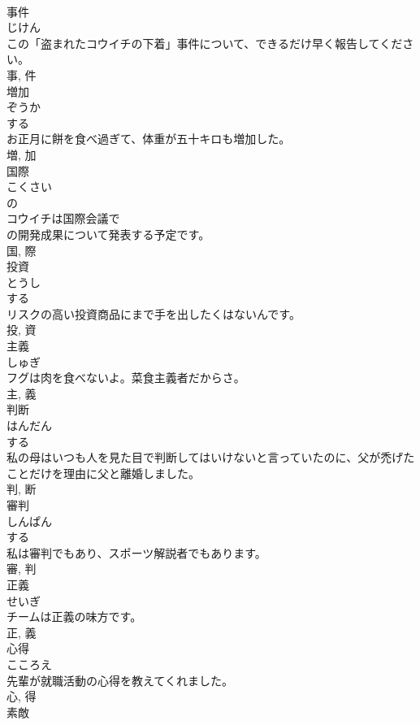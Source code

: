 \documentclass[8pt]{extreport}
\begin{document}
\begin{CJK}{UTF8}{min}
\\	事件	
\\	じけん	
\\	この「盗まれたコウイチの下着」事件について、できるだけ早く報告してください。	
\\	事, 件	
\\	増加	
\\	ぞうか	
\\	する 
\\	お正月に餅を食べ過ぎて、体重が五十キロも増加した。	
\\	増, 加	
\\	国際	
\\	こくさい	
\\	の 
\\	コウイチは国際会議で
\\	の開発成果について発表する予定です。	
\\	国, 際	
\\	投資	
\\	とうし	
\\	する 
\\	リスクの高い投資商品にまで手を出したくはないんです。	
\\	投, 資	
\\	主義	
\\	しゅぎ	
\\	フグは肉を食べないよ。菜食主義者だからさ。	
\\	主, 義	
\\	判断	
\\	はんだん	
\\	する 
\\	私の母はいつも人を見た目で判断してはいけないと言っていたのに、父が禿げたことだけを理由に父と離婚しました。	
\\	判, 断	
\\	審判	
\\	しんぱん	
\\	する 
\\	私は審判でもあり、スポーツ解説者でもあります。	
\\	審, 判	
\\	正義	
\\	せいぎ	
\\	チームは正義の味方です。	
\\	正, 義	
\\	心得	
\\	こころえ	
\\	先輩が就職活動の心得を教えてくれました。	
\\	心, 得	
\\	素敵	

\end{CJK}
\end{document}
